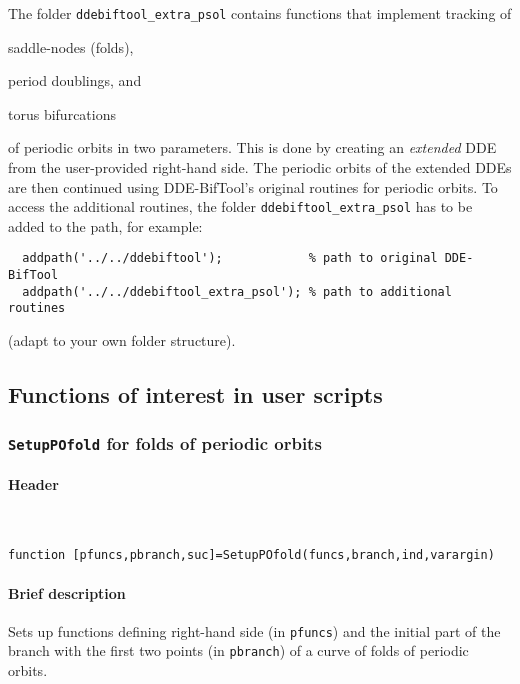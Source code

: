 \documentclass[11pt]{scrartcl}
\newcommand{\blist}[1]{\mbox{\lstinline!#1!}}  \newlength{\tabw}
\begin{document}
The folder \texttt{ddebiftool\_extra\_psol} contains functions that
implement tracking of
\begin{compactitem}
\item saddle-nodes (folds),
\item period doublings, and
\item torus bifurcations
\end{compactitem}
of periodic orbits in two parameters. This is done by creating an
\emph{extended} DDE from the user-provided right-hand side. The
periodic orbits of the extended DDEs are then continued using
DDE-BifTool's original routines for periodic orbits.  To access the
additional routines, the folder \texttt{ddebiftool\_extra\_psol} has
to be added to the path, for example:
\begin{lstlisting}
  addpath('../../ddebiftool');            % path to original DDE-BifTool
  addpath('../../ddebiftool_extra_psol'); % path to additional routines
\end{lstlisting}
(adapt to your own folder structure).
\subsection{Functions of interest in user scripts}
\label{sec:user}



\subsubsection{\blist{SetupPOfold} for folds of periodic orbits}
\label{fold}

\paragraph{Header}\
\begin{lstlisting}[basicstyle={\ttfamily\small}]
function [pfuncs,pbranch,suc]=SetupPOfold(funcs,branch,ind,varargin)
\end{lstlisting}

\paragraph{Brief description}
Sets up functions defining right-hand side (in \blist{pfuncs}) and the
initial part of the branch with the first two points (in
\blist{pbranch}) of a curve of folds of periodic orbits.
\end{document}
